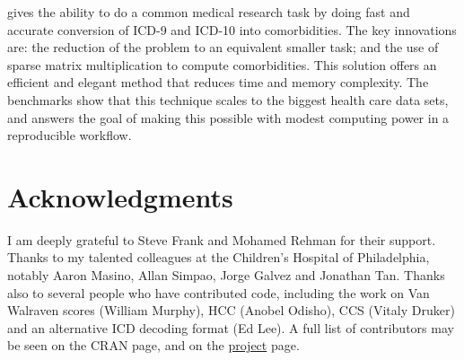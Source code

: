 \documentclass[article]{jss}
\begin{document}
 gives  the ability to do a common medical research
task by doing fast and accurate conversion of ICD-9 and ICD-10 into
comorbidities. The key innovations are: the reduction of the problem to
an equivalent smaller task; and the use of sparse matrix multiplication
to compute comorbidities. This solution offers an efficient and elegant
method that reduces time and memory complexity. The benchmarks show that
this technique scales to the biggest health care data sets, and answers
the goal of making this possible with modest computing power in a
reproducible workflow.

\section*{Acknowledgments}

I am deeply grateful to Steve Frank and Mohamed Rehman for their
support. Thanks to my talented colleagues at the Children's Hospital of
Philadelphia, notably Aaron Masino, Allan Simpao, Jorge Galvez and
Jonathan Tan. Thanks also to several people who have contributed code,
including the work on Van Walraven scores (William Murphy), HCC (Anobel
Odisho), CCS (Vitaly Druker) and an alternative ICD decoding format (Ed
Lee). A full list of contributors may be seen on the
\href{https://cran.r-project.org/web/packages/icd/index.html}{}
CRAN page, and on the \href{https://jackwasey.github.io/icd/}{project}
page.

\renewcommand\refname{References}

\end{document}
